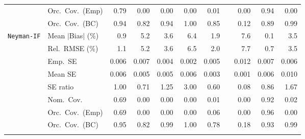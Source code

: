 \begin{landscape}
\begin{longtable}{llrrrrrrrrr}
 & Orc.\ Cov.\ (Emp) & \cellcolor{ranktwo}0.79 & 0.00 & 0.00 & 0.00 & \cellcolor{rankthree}0.01 &  & 0.00 & \cellcolor{rankone}0.94 & 0.00 \\
 & Orc.\ Cov.\ (BC) & \cellcolor{rankone}0.94 & 0.82 & \cellcolor{rankone}0.94 & \cellcolor{rankthree}1.00 & 0.85 &  & 0.12 & 0.89 & \cellcolor{ranktwo}0.99 \\
\addlinespace[2pt]
\quad \texttt{Neyman-IF} & Mean $|$Bias$|$ (\%) & \cellcolor{ranktwo}0.9 & 5.2 & 3.6 & 6.4 & \cellcolor{rankthree}1.9 &  & 7.6 & \cellcolor{rankone}0.1 & 3.5 \\
 & Rel.\ RMSE (\%) & \cellcolor{ranktwo}1.1 & 5.2 & 3.6 & 6.5 & \cellcolor{rankthree}2.0 &  & 7.7 & \cellcolor{rankone}0.7 & 3.5 \\
 & Emp.\ SE & 0.006 & 0.007 & 0.004 & 0.002 & 0.005 &  & 0.012 & 0.007 & 0.006 \\
 & Mean SE & 0.006 & 0.005 & 0.005 & 0.006 & 0.003 &  & 0.001 & 0.006 & 0.010 \\
 & SE ratio & \cellcolor{rankone}1.00 & 0.71 & \cellcolor{rankthree}1.25 & 3.00 & 0.60 &  & 0.08 & \cellcolor{ranktwo}0.86 & 1.67 \\
 & Nom.\ Cov. & \cellcolor{ranktwo}0.69 & 0.00 & 0.00 & 0.00 & 0.01 &  & 0.00 & \cellcolor{rankone}0.92 & \cellcolor{rankthree}0.02 \\
 & Orc.\ Cov.\ (Emp) & \cellcolor{ranktwo}0.69 & 0.00 & 0.00 & 0.00 & \cellcolor{rankthree}0.06 &  & 0.00 & \cellcolor{rankone}0.96 & 0.00 \\
 & Orc.\ Cov.\ (BC) & \cellcolor{rankone}0.95 & 0.82 & \cellcolor{rankthree}0.99 & 1.00 & 0.78 &  & 0.18 & \cellcolor{ranktwo}0.93 & \cellcolor{rankthree}0.99 \\
\addlinespace[2pt]
\end{longtable}
\end{landscape}
